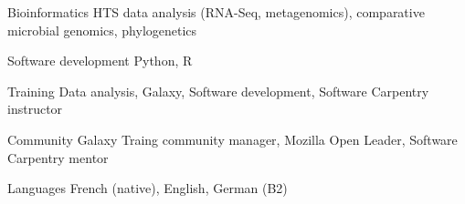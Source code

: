

\begin{cvskills}

  \cvskill
    {Bioinformatics} %
    {HTS data analysis (RNA-Seq, metagenomics), comparative microbial genomics, phylogenetics} %

  \cvskill
    {Software development} %
    {Python, R} %

  \cvskill
    {Training} %
    {Data analysis, Galaxy, Software development, Software Carpentry instructor} %

  \cvskill
    {Community} %
    {Galaxy Traing community manager, Mozilla Open Leader, Software Carpentry mentor} %

  \cvskill
    {Languages} %
    {French (native), English, German (B2)} %

\end{cvskills}
